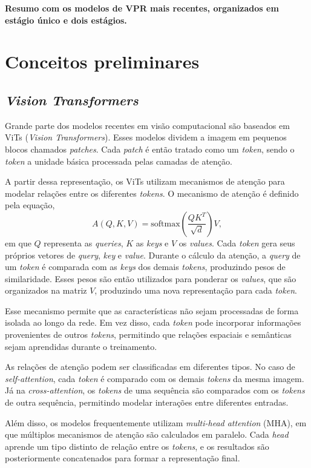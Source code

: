 \documentclass[letterpaper, 10 pt, conference]{ieeeconf}  %
\begin{document}
\textbf{Resumo com os modelos de VPR mais recentes, organizados em estágio único e dois estágios.}

\section{Conceitos preliminares}

\subsection{\textit{Vision Transformers}}

Grande parte dos modelos recentes em visão computacional são baseados em ViTs (\textit{Vision Transformers}). Esses modelos dividem a imagem em pequenos blocos chamados \textit{patches}. Cada \textit{patch} é então tratado como um \textit{token}, sendo o \textit{token} a unidade básica processada pelas camadas de atenção.

A partir dessa representação, os ViTs utilizam mecanismos de atenção para modelar relações entre os diferentes \textit{tokens}. O mecanismo de atenção é definido pela equação,
$$
A(Q,K,V) = \text{softmax}\left(\frac{QK^T}{\sqrt{d}}\right)V,
$$
\noindent
em que $Q$ representa as \textit{queries}, $K$ as \textit{keys} e $V$ os \textit{values}. Cada \textit{token} gera seus próprios vetores de \textit{query}, \textit{key} e \textit{value}. Durante o cálculo da atenção, a \textit{query} de um \textit{token} é comparada com as \textit{keys} dos demais \textit{tokens}, produzindo pesos de similaridade. Esses pesos são então utilizados para ponderar os \textit{values}, que são organizados na matriz $V$, produzindo uma nova representação para cada \textit{token}.

Esse mecanismo permite que as características não sejam processadas de forma isolada ao longo da rede. Em vez disso, cada \textit{token} pode incorporar informações provenientes de outros \textit{tokens}, permitindo que relações espaciais e semânticas sejam aprendidas durante o treinamento.

As relações de atenção podem ser classificadas em diferentes tipos. No caso de \textit{self-attention}, cada \textit{token} é comparado com os demais \textit{tokens} da mesma imagem. Já na \textit{cross-attention}, os \textit{tokens} de uma sequência são comparados com os \textit{tokens} de outra sequência, permitindo modelar interações entre diferentes entradas.

Além disso, os modelos frequentemente utilizam \textit{multi-head attention} (MHA), em que múltiplos mecanismos de atenção são calculados em paralelo. Cada \textit{head} aprende um tipo distinto de relação entre os \textit{tokens}, e os resultados são posteriormente concatenados para formar a representação final.
\end{document}
